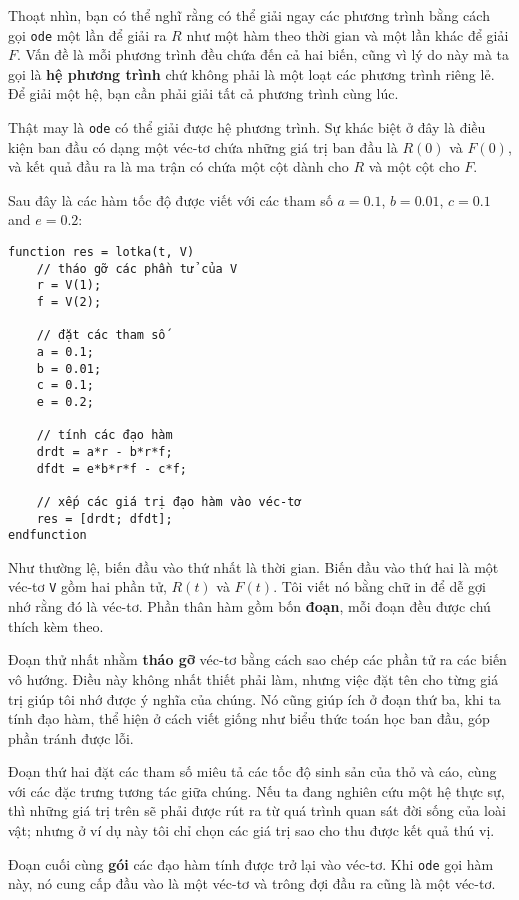 \documentclass[12pt]{book}
\begin{document}
Thoạt nhìn, bạn có thể nghĩ rằng có thể giải ngay các phương trình
bằng cách gọi {\tt ode} một lần để giải ra $R$ như một hàm theo
thời gian và một lần khác để giải $F$. Vấn đề là mỗi phương trình
đều chứa đến cả hai biến, cũng vì lý do này mà ta gọi là  
{\bf hệ phương trình} chứ không phải là một loạt các phương trình
riêng lẻ. Để giải một hệ, bạn cần phải giải tất cả phương trình
cùng lúc.

Thật may là {\tt ode} có thể giải được hệ phương trình. Sự
khác biệt ở đây là điều kiện ban đầu có dạng một véc-tơ chứa
những giá trị ban đầu là $R(0)$ và $F(0)$, và kết quả đầu ra là
ma trận có chứa một cột dành cho $R$ và một cột cho $F$.

Sau đây là các hàm tốc độ được viết với các tham số
$a = 0.1$, $b = 0.01$, $c = 0.1$ and $e = 0.2$:

\begin{verbatim}
function res = lotka(t, V)
    // tháo gỡ các phần tử của V
    r = V(1);
    f = V(2);

    // đặt các tham số
    a = 0.1;
    b = 0.01;
    c = 0.1;
    e = 0.2;
    
    // tính các đạo hàm
    drdt = a*r - b*r*f;
    dfdt = e*b*r*f - c*f;
    
    // xếp các giá trị đạo hàm vào véc-tơ
    res = [drdt; dfdt];
endfunction
\end{verbatim}
%
Như thường lệ, biến đầu vào thứ nhất là thời gian. 
Biến đầu vào thứ hai là một véc-tơ {\tt V} gồm hai phần tử,
$R(t)$ và $F(t)$. Tôi viết nó bằng chữ in để dễ gợi nhớ
rằng đó là véc-tơ. Phần thân hàm gồm bốn {\bf đoạn},
mỗi đoạn đều được chú thích kèm theo.

Đoạn thử nhất nhằm {\bf tháo gỡ} véc-tơ bằng cách sao chép
các phần tử ra các biến vô hướng. Điều này không nhất thiết phải làm,
nhưng việc đặt tên cho từng giá trị giúp tôi nhớ được ý nghĩa của chúng.
Nó cũng giúp ích ở đoạn thứ ba, khi ta tính đạo hàm, thể hiện ở 
cách viết giống như biểu thức toán học ban đầu, góp phần tránh được lỗi.

Đoạn thứ hai đặt các tham số miêu tả các tốc độ sinh sản của
thỏ và cáo, cùng với các đặc trưng tương tác giữa chúng. Nếu ta
đang nghiên cứu một hệ thực sự, thì những giá trị trên sẽ phải 
được rút ra từ quá trình quan sát đời sống của loài vật; nhưng ở
ví dụ này tôi chỉ chọn các giá trị sao cho thu được kết quả thú vị.

Đoạn cuối cùng {\bf gói} các đạo hàm tính được trở lại vào véc-tơ.
Khi {\tt ode} gọi hàm này, nó cung cấp đầu vào là một véc-tơ
và trông đợi đầu ra cũng là một véc-tơ.
\end{document}
